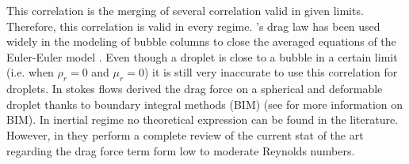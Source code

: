 This correlation is the merging of several correlation valid in given limits.
Therefore, this correlation is valid in every regime.
\citet{tomiyama1998drag}'s drag law has been used widely in the modeling of bubble columns to close the averaged equations of the Euler-Euler model \citep{sporleder2012population}. 
Even though a droplet is close to a bubble in a certain limit (i.e. when $\rho_r = 0$ and $\mu_r = 0$) it is still very inaccurate to use this correlation for droplets. 
In stokes flows \citet{dolata2021faxen} derived the drag force on a spherical and deformable droplet thanks to boundary integral methods (BIM) (see \citet{pozrikidis1992boundary} for more information on BIM).
In inertial regime no theoretical expression can be found in the literature.
However, in \citet{magnaudet1997forces} they perform a complete review of the current stat of the art regarding the drag force term form low to moderate Reynolds numbers. 

